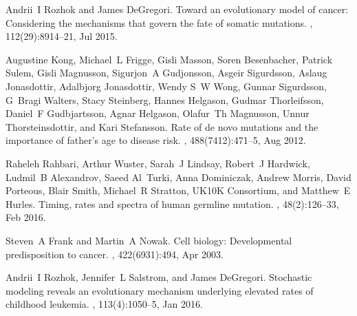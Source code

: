 \documentclass[aps,singlecolumn]{revtex4-1}
\begin{document}
\begin{thebibliography}{10}
Andrii~I Rozhok and James DeGregori.
\newblock Toward an evolutionary model of cancer: Considering the mechanisms
  that govern the fate of somatic mutations.
, 112(29):8914--21, Jul 2015.

Augustine Kong, Michael~L Frigge, Gisli Masson, Soren Besenbacher, Patrick
  Sulem, Gisli Magnusson, Sigurjon~A Gudjonsson, Asgeir Sigurdsson, Aslaug
  Jonasdottir, Adalbjorg Jonasdottir, Wendy S~W Wong, Gunnar Sigurdsson,
  G~Bragi Walters, Stacy Steinberg, Hannes Helgason, Gudmar Thorleifsson,
  Daniel~F Gudbjartsson, Agnar Helgason, Olafur~Th Magnusson, Unnur
  Thorsteinsdottir, and Kari Stefansson.
\newblock Rate of de novo mutations and the importance of father's age to
  disease risk.
, 488(7412):471--5, Aug 2012.

Raheleh Rahbari, Arthur Wuster, Sarah~J Lindsay, Robert~J Hardwick, Ludmil~B
  Alexandrov, Saeed Al~Turki, Anna Dominiczak, Andrew Morris, David Porteous,
  Blair Smith, Michael~R Stratton, {UK10K Consortium}, and Matthew~E Hurles.
\newblock Timing, rates and spectra of human germline mutation.
, 48(2):126--33, Feb 2016.

Steven~A Frank and Martin~A Nowak.
\newblock Cell biology: Developmental predisposition to cancer.
, 422(6931):494, Apr 2003.

Andrii~I Rozhok, Jennifer~L Salstrom, and James DeGregori.
\newblock Stochastic modeling reveals an evolutionary mechanism underlying
  elevated rates of childhood leukemia.
, 113(4):1050--5, Jan 2016.

\end{thebibliography}
\end{document}
